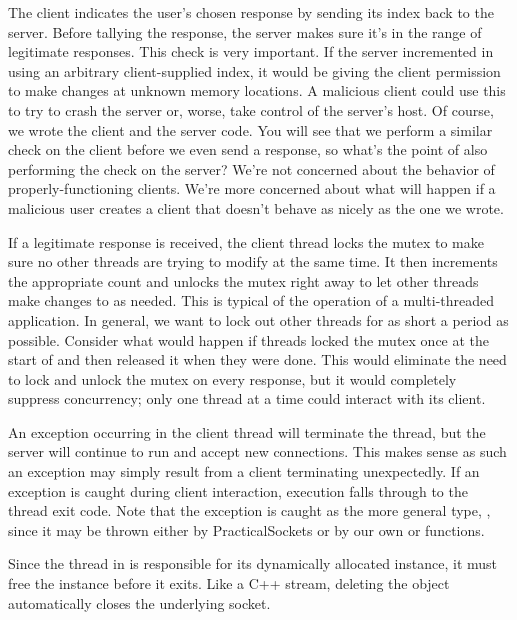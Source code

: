\begin{topcode}
\begin{bottomcode}
The client indicates the user's chosen response by sending its index
back to the server.  Before tallying the response, the server makes
sure it's in the range of legitimate responses.  This check is very
important.  If the server incremented in  using an
arbitrary client-supplied index, it would be giving the client
permission to make changes at unknown memory locations.  A malicious
client could use this to try to crash the server or, worse, take
control of the server's host.  Of course, we wrote the client and the
server code.  You will see that we perform a similar check on the
client before we even send a response, so what's the point of also
performing the check on the server?  We're not concerned about the
behavior of properly-functioning clients.  We're more concerned about
what will happen if a malicious user creates a client that doesn't
behave as nicely as the one we wrote.

If a legitimate response is received, the client thread locks the
mutex to make sure no other threads are trying to modify 
at the same time.  It then increments the appropriate count and
unlocks the mutex right away to let other threads make changes to
 as needed.  This is typical of the operation of a
multi-threaded application.  In general, we want to lock out other
threads for as short a period as possible.  Consider what would happen
if threads locked the mutex once at the start of
 and then released it when they were done.  This
would eliminate the need to lock and unlock the mutex on every
response, but it would completely suppress concurrency; only one
thread at a time could interact with its client.


An exception occurring in the client thread will terminate the thread,
but the server will continue to run and accept new connections.  This
makes sense as such an exception may simply result from a client
terminating unexpectedly.  If an exception is caught during client
interaction, execution falls through to the thread exit code.  Note
that the exception is caught as the more general type,
, since it may be thrown either by
PracticalSockets or by our own  or
 functions.


Since the thread in  is responsible for its
dynamically allocated  instance, it must free the
instance before it exits.  Like a C++ stream, deleting the object
automatically closes the underlying socket.

\end{bottomcode}

\end{topcode}

